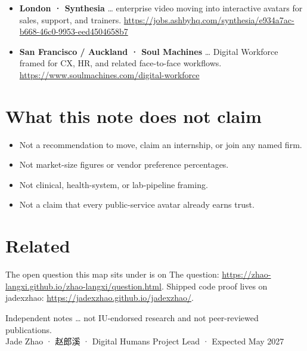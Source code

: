 \documentclass[11pt,a4paper]{article}
\begin{document}
\begin{itemize}
  \item \textbf{London · Synthesia} \ldots{} enterprise video moving into interactive avatars for sales, support, and trainers.
    \url{https://jobs.ashbyhq.com/synthesia/e934a7ac-b668-46c0-9953-eed4504658b7}
  \item \textbf{San Francisco / Auckland · Soul Machines} \ldots{} Digital Workforce framed for CX, HR, and related face-to-face workflows.
    \url{https://www.soulmachines.com/digital-workforce}
\end{itemize}

\section*{What this note does not claim}

\begin{itemize}
  \item Not a recommendation to move, claim an internship, or join any named firm.
  \item Not market-size figures or vendor preference percentages.
  \item Not clinical, health-system, or lab-pipeline framing.
  \item Not a claim that every public-service avatar already earns trust.
\end{itemize}

\section*{Related}

The open question this map sits under is on The question:
\url{https://zhao-langxi.github.io/zhao-langxi/question.html}.
Shipped code proof lives on jadexzhao:
\url{https://jadexzhao.github.io/jadexzhao/}.

\vspace{1.2em}
\noindent\small Independent notes \ldots{} not IU-endorsed research and not peer-reviewed publications.\\
Jade Zhao · 赵郎溪 · Digital Humans Project Lead · Expected May 2027
\end{document}
